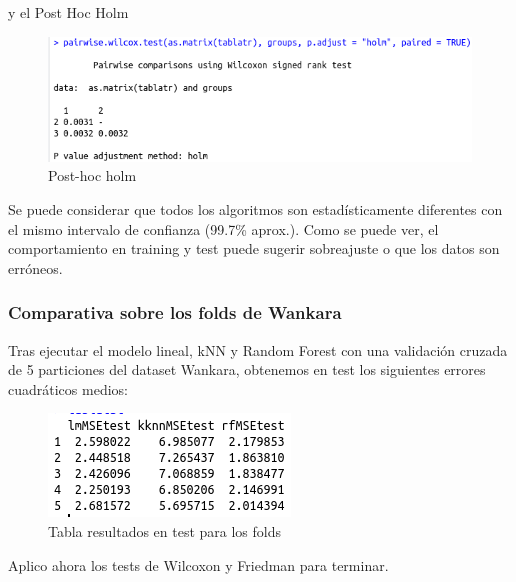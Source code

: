\begin{itemize}
	y el Post Hoc Holm 
	
	\begin{figure}[H] %
		\centering
		\includegraphics[scale=0.6]{ph2.png}  %
		\caption{Post-hoc holm} 
		\label{fig:ph2}
	\end{figure}
	
	Se puede considerar que todos los algoritmos son estadísticamente diferentes con el mismo intervalo de confianza (99.7\% aprox.). Como se puede ver, el comportamiento en training y test puede sugerir sobreajuste o que los datos son erróneos.
\end{itemize}
 
 
\subsubsection{Comparativa sobre los folds de Wankara}

Tras ejecutar el modelo lineal, kNN y Random Forest con una validación cruzada de 5 particiones del dataset Wankara, obtenemos en test los siguientes errores cuadráticos medios:

\begin{figure}[H] %
	\centering
	\includegraphics[scale=0.6]{tablatst2.png}  %
	\caption{Tabla resultados en test para los folds} 
	\label{fig:tablatst2}
\end{figure}

Aplico ahora los tests de Wilcoxon y Friedman para terminar. 

